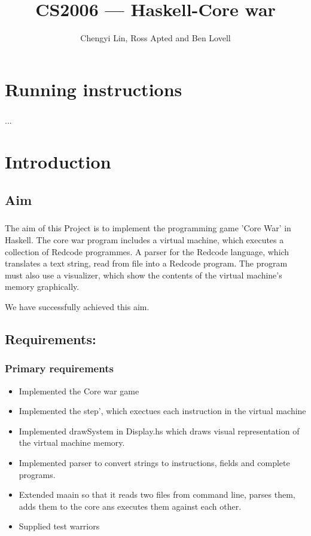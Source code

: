 \documentclass{report}
\begin{document}
\title{CS2006 --- Haskell-Core war}
\author{Chengyi Lin, Ross Apted and Ben Lovell}

\maketitle
\tableofcontents

\chapter{Running instructions}
	\paragraph{}...

\chapter{Introduction}
	\section{Aim}

		\paragraph{}The aim of this Project is to implement the programming game 'Core War' in Haskell. The core war program includes a virtual machine, which executes a collection of Redcode programmes. A parser for the Redcode language, which translates a text string, read from file into a Redcode program. The program must also use a visualizer, which show the contents of the virtual machine’s memory graphically. 

We have successfully achieved this aim.

		

	\section{Requirements:}
		\subsection{Primary requirements}
			\begin{itemize}
			\item Implemented  the Core war game
			\item Implemented the step', which exectues each instruction in the virtual machine
			\item Implemented drawSystem in Display.hs which draws visual representation of the virtual machine memory.
			\item Implemented parser to convert strings to instructions, fields and complete programs.
			\item Extended maain so that it reads two files from command line, parses them, adds them to the core ans executes them against each other.
			\item Supplied test warriors
			\end{itemize}
\end{document}
